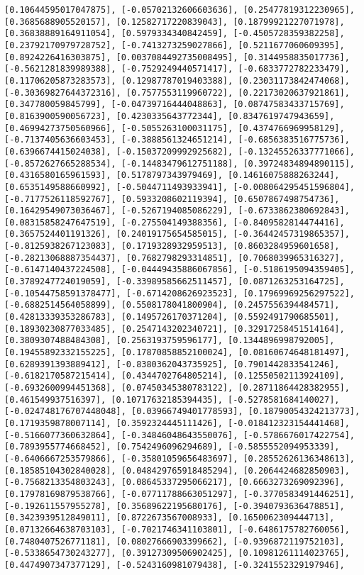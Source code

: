 \documentclass[11pt]{article}
\begin{document}
\begin{Verbatim}[commandchars=\\\{\}]
[0.10644595017047875], [-0.05702132606603636], [0.25477819312230965], [0.3685688905520157], [0.12582717220839043], [0.18799921227071978], [0.36838889164911054], [0.5979334340842459], [-0.4505728359382258], [0.23792170979728752], [-0.7413273259027866], [0.5211677060609395], [0.8924226416303875], [0.0037084492735008495], [0.3144958835017736], [-0.5621281839989388], [-0.7529249440571417], [-0.6833772782233479], [0.11706205873283573], [0.12987787019403388], [0.23031173842474068], [-0.30369827644372316], [0.7577553119960722], [0.22173020637921861], [0.347780059845799], [-0.04739716444048863], [0.08747583433715769], [0.8163900590056723], [0.4230335643772344], [0.8347619747943659], [0.46994273750560966], [-0.5055263100031175], [0.4374766969958129], [-0.7137405636603453], [-0.3888561324651214], [-0.6856383516775736], [0.6396674415024038], [-0.15037209992925682], [-0.13245526337771066], [-0.8572627665288534], [-0.14483479612751188], [0.39724834894890115], [0.4316580165961593], [0.5178797343979469], [0.14616075888263244], [0.6535149588660992], [-0.5044711493933941], [-0.008064295451596804], [-0.7177526118592767], [0.5933208602119394], [0.6507867498754736], [0.16429549073036467], [-0.5267194085086229], [-0.6733862380692843], [0.08315858247647519], [-0.275504149388356], [-0.8409582814474416], [0.3657524401191326], [0.24019175654585015], [-0.36442457319865357], [-0.8125938267123083], [0.1719328932959513], [0.8603284959601658], [-0.28213068887354437], [0.7682798293314851], [0.7068039965316327], [-0.6147140437224508], [-0.04449435886067856], [-0.5186195094359405], [0.3789247724019059], [-0.33989585662511457], [0.0871263253164725], [-0.10544758591378477], [-0.6714208626923523], [0.17969969256297522], [-0.6882514564058899], [0.5508178041800904], [0.2457556394484571], [0.42813339353286783], [0.1495726170371204], [0.5592491790685501], [0.18930230877033485], [0.2547143202340721], [0.32917258451514164], [0.3809307488484308], [0.2563193759596177], [0.1344896998792005], [0.19455892332155225], [0.17870858852100024], [0.08160674648181497], [0.6289391393889412], [-0.8380362043735925], [0.7901442833541246], [-0.6182170587215414], [0.4344702764805214], [0.12550502113924109], [-0.6932600994451368], [0.07450345380783122], [0.28711864428382955], [0.461549937516397], [0.10717632185394435], [-0.5278581684140027], [-0.024748176707448048], [0.03966749401778593], [0.18790054324213773], [0.1719359878007114], [0.3592324445111426], [-0.018412323154441468], [-0.5166077360632864], [-0.34846048643550076], [-0.5786676017422754], [0.7893955774668452], [0.7542496096294689], [-0.5855552094953339], [-0.6406667253579866], [-0.35801059656483697], [0.28552626136348613], [0.18585104302840028], [0.048429765918485294], [0.2064424682850903], [-0.7568213354803243], [0.08645337295066217], [0.6663273269092396], [0.17978169879538766], [-0.07711788663051297], [-0.3770583491446251], [-0.192611557955278], [0.35689622195680176], [-0.3940793636478851], [0.3423939512849011], [0.8722673567008933], [0.1650062309444713], [0.07132664638703103], [-0.7021746341103801], [-0.6486175782760056], [0.7480407526771181], [0.08027666903399662], [-0.9396872119752103], [-0.5338654730243277], [0.39127309506902425], [0.10981261114023765], [0.4474907347377129], [-0.5243160981079438], [-0.3241552329197946], 
\end{Verbatim}
\end{document}
